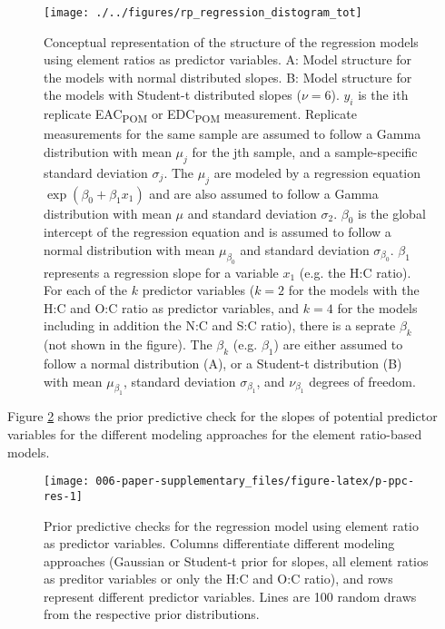 \documentclass[draft,linenumbers]{agujournal2018}
\begin{document}
\begin{figure}[H]

{\centering \texttt{[image: ./../figures/rp\_regression\_distogram\_tot]} 

}

\caption{Conceptual representation of the structure of the regression models \citep{Kruschke.2015, Baath.2018} using element ratios as predictor variables. A: Model structure for the models with normal distributed slopes. B: Model structure for the models with Student-t distributed slopes ($\nu = 6$). $y_i$ is the ith replicate EAC\textsubscript{POM} or EDC\textsubscript{POM} measurement. Replicate measurements for the same sample are assumed to follow a Gamma distribution with mean $\mu_j$ for the jth sample, and a sample-specific standard deviation $\sigma_j$. The $\mu_j$ are modeled by a regression equation $\exp\left(\beta_0 + \beta_1 x_1\right)$ and are also assumed to follow a Gamma distribution with mean $\mu$ and standard deviation $\sigma_2$. $\beta_0$ is the global intercept of the regression equation and is assumed to follow a normal distribution with mean $\mu_{\beta_0}$ and standard deviation $\sigma_{\beta_0}$. $\beta_1$ represents a regression slope for a variable $x_1$ (e.g. the H:C ratio). For each of the $k$ predictor variables ($k=2$ for the models with the H:C and O:C ratio as predictor variables, and $k=4$ for the models including in addition the N:C and S:C ratio), there is a seprate $\beta_k$ (not shown in the figure). The $\beta_k$ (e.g. $\beta_1$) are either assumed to follow a normal distribution (A), or a Student-t distribution (B) with mean $\mu_{\beta_1}$, standard deviation $\sigma_{\beta_1}$, and $\nu_{\beta_1}$ degrees of freedom.}\label{fig:p-reg-distogram-res}
\end{figure}

\clearpage

Figure \ref{fig:p-ppc-res} shows the prior predictive check for the
slopes of potential predictor variables for the different modeling
approaches for the element ratio-based models.

\begin{figure}[H]

{\centering \texttt{[image: 006-paper-supplementary\_files/figure-latex/p-ppc-res-1]} 

}

\caption{Prior predictive checks for the regression model using element ratio as predictor variables. Columns differentiate different modeling approaches (Gaussian or Student-t prior for slopes, all element ratios as preditor variables or only the H:C and O:C ratio), and rows represent different predictor variables. Lines are 100 random draws from the respective prior distributions.}\label{fig:p-ppc-res}
\end{figure}
\end{document}
